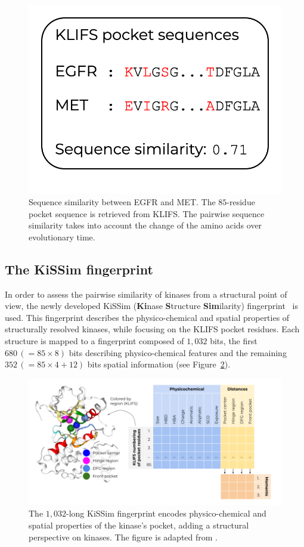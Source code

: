 \documentclass[9pt,training,ASAPversion]{livecoms}
\begin{document}
\begin{figure}[ht]
    \centering
    \includegraphics[width=0.5\columnwidth]{sequence_similarity.png}
    \caption{Sequence similarity between EGFR and MET. The $85$-residue pocket sequence is retrieved from KLIFS. The pairwise sequence similarity takes into account the change of the amino acids over evolutionary time.}
    \label{fig:pocket_sequence}
\end{figure}

\subsection{The KiSSim fingerprint}
In order to assess the pairwise similarity of kinases from a structural point of view, the newly developed KiSSim (\textbf{Ki}nase \textbf{S}tructure \textbf{Sim}ilarity) fingerprint~\cite{sydow_2022_jcim, kissim_package} is used. This fingerprint describes the physico-chemical and spatial properties of structurally resolved kinases, while focusing on the KLIFS pocket residues. Each structure is mapped to a fingerprint composed of $1,032$ bits, the first $680 \, (=85 \times 8)$ bits describing physico-chemical features and the remaining $352 \, (=85 \times 4 + 12)$ bits spatial information (see Figure~\ref{fig:kissim_similarity}).

\begin{figure}[ht]
    \centering
    \includegraphics[width=\columnwidth]{kissim_fingerprint.png}
    \caption{The $1,032$-long KiSSim fingerprint encodes physico-chemical and spatial properties of the kinase's pocket, adding a structural perspective on kinases. The figure is adapted from \cite{kissim_package}.}
    \label{fig:kissim_similarity}
\end{figure}
\end{document}
